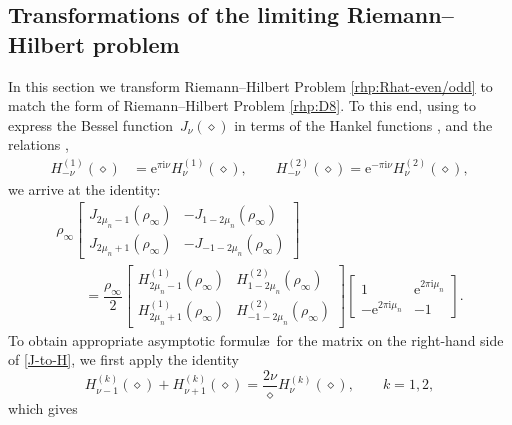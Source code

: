 \documentclass[pdftex]{sigma}
\numberwithin{equation}{section}
\newcommand{\ee}{\mathrm{e}}
\newcommand{\ii}{\mathrm{i}}
\begin{document}
\subsection{Transformations of the limiting Riemann--Hilbert problem} In this section we transform Riemann--Hilbert Problem \ref{rhp:Rhat-even/odd} to match the form of Riemann--Hilbert Problem \ref{rhp:D8}. To this end, using \cite[equations~(10.4.4) and (10.4.6)]{DLMF} to express the Bessel function~$J_\nu(\diamond)$ in terms of the Hankel functions ,  and the relations \cite[equation~(10.4.4) and~(10.4.6)]{DLMF},
\begin{align*}
 H_{-\nu}^{(1)}(\diamond) &= \ee^{\pi \ii \nu}H_{\nu}^{(1)}(\diamond) , \qquad
 H_{-\nu}^{(2)}(\diamond) = \ee^{-\pi \ii \nu}H_{\nu}^{(2)}(\diamond) ,
\end{align*}
we arrive at the identity:
\begin{gather}
 \rho_\infty \begin{bmatrix}J_{2\mu_n - 1}(\rho_\infty) & -J_{1- 2\mu_n}(\rho_\infty)\\
 J_{2\mu_n +1}(\rho_\infty) & -J_{-1-2\mu_n}(\rho_\infty)\end{bmatrix}\nonumber \\
 \qquad= \dfrac{\rho_\infty}{2} \begin{bmatrix}H_{2\mu_n - 1}^{(1)}(\rho_\infty) & H_{1 -2\mu_n}^{(2)}(\rho_\infty) \\ H^{(1)}_{2\mu_n + 1}(\rho_\infty) & H_{-1 -2\mu_n}^{(2)}(\rho_\infty) \end{bmatrix} \begin{bmatrix} 1 & \ee^{2\pi \ii \mu_n} \\ -\ee^{2\pi \ii \mu_n} & -1 \end{bmatrix}. \label{J-to-H}
\end{gather}
To obtain appropriate asymptotic formul\ae\ for the matrix on the right-hand side of \eqref{J-to-H}, we first apply the identity \cite[equation~(10.6.1)]{DLMF}
\begin{equation*}
 H^{(k)}_{\nu-1}(\diamond) + H^{(k)}_{\nu + 1}(\diamond) = \dfrac{2\nu}{\diamond} H^{(k)}_\nu(\diamond), \qquad k = 1, 2,
\end{equation*}
which gives
\end{document}
